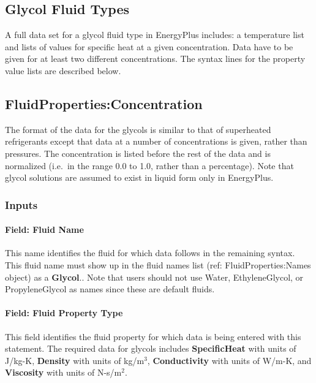 \subsection{Glycol Fluid Types}\label{glycol-fluid-types}

A full data set for a glycol fluid type in EnergyPlus includes: a temperature list and lists of values for specific heat at a given concentration. Data have to be given for at least two different concentrations. The syntax lines for the property value lists are described below.

\subsection{FluidProperties:Concentration}\label{fluidpropertiesconcentration}

The format of the data for the glycols is similar to that of superheated refrigerants except that data at a number of concentrations is given, rather than pressures. The concentration is listed before the rest of the data and is normalized (i.e.~in the range 0.0 to 1.0, rather than a percentage). Note that glycol solutions are assumed to exist in liquid form only in EnergyPlus.

\subsubsection{Inputs}\label{inputs-5-012}

\paragraph{Field: Fluid Name}\label{field-fluid-name-2}

This name identifies the fluid for which data follows in the remaining syntax. This fluid name must show up in the fluid names list (ref: FluidProperties:Names object) as a \textbf{Glycol}.. Note that users should not use Water, EthyleneGlycol, or PropyleneGlycol as names since these are default fluids.

\paragraph{Field: Fluid Property Type}\label{field-fluid-property-type-2}

This field identifies the fluid property for which data is being entered with this statement. The required data for glycols includes \textbf{SpecificHeat} with units of J/kg-K, \textbf{Density} with units of kg/m\(^{3}\), \textbf{Conductivity} with units of W/m-K, and \textbf{Viscosity} with units of N-s/m\(^{2}\).

